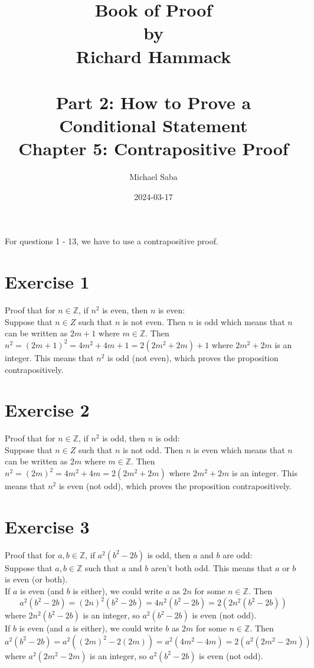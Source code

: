 \documentclass[12pt]{article}
\title{%
    \Huge Book of Proof \\
    \large by \\
    \Large Richard Hammack \\~\\
    \huge Part 2: How to Prove a Conditional Statement \\
    \LARGE Chapter 5: Contrapositive Proof
}
\date{2024-03-17}
\author{Michael Saba}
\newcommand{\Z}{\mathbb{Z}}
\begin{document}
    \maketitle
    \newpage

    For questions 1 - 13, we have to use a contrapositive proof. \\

    \section*{Exercise 1}
    Proof that for $n \in \Z$,
    if $n^2$ is even,
    then $n$ is even: \\
    Suppose that $n \in Z$ 
    such that $n$ is not even.
    Then $n$ is odd which means
    that $n$ can be written as $2m + 1$ where $m \in \Z$.
    Then $n^2 = (2m+1)^2 = 4m^2 + 4m + 1 = 2(2m^2 + 2m) + 1$
    where $2m^2 + 2m$ is an integer.
    This means that $n^2$ is odd (not even),
    which proves the proposition contrapositively.

    \section*{Exercise 2}
    Proof that for $n \in \Z$,
    if $n^2$ is odd,
    then $n$ is odd: \\
    Suppose that $n \in Z$ 
    such that $n$ is not odd.
    Then $n$ is even which means
    that $n$ can be written as $2m$ where $m \in \Z$.
    Then $n^2 = (2m)^2 = 4m^2 + 4m = 2(2m^2 + 2m)$
    where $2m^2 + 2m$ is an integer.
    This means that $n^2$ is even (not odd),
    which proves the proposition contrapositively.

    \section*{Exercise 3}
    Proof that for $a, b \in \Z$,
    if $a^2(b^2 - 2b)$ is odd,
    then $a$ and $b$ are odd: \\
    Suppose that $a, b \in \Z$
    such that $a$ and $b$ aren't both odd. 
    This means that $a$ or $b$ is even (or both). \\
    If $a$ is even (and $b$ is either),
    we could write $a$ as $2n$ for some $n \in \Z$.
    Then
    \[ a^2(b^2 - 2b) = (2n)^2(b^2 - 2b)
    = 4n^2(b^2 - 2b) = 2(2n^2(b^2 - 2b)) \]
    where $2n^2(b^2 - 2b)$ is an integer,
    so $a^2(b^2 - 2b)$ is even (not odd). \\
    If $b$ is even (and $a$ is either),
    we could write $b$ as $2m$ for some $n \in \Z$.
    Then
    \[ a^2(b^2 - 2b) = a^2((2m)^2 - 2(2m))
    = a^2(4m^2 - 4m) = 2(a^2(2m^2 - 2m)) \]
    where $a^2(2m^2 - 2m)$ is an integer,
    so $a^2(b^2 - 2b)$ is even (not odd). \\
\end{document}

